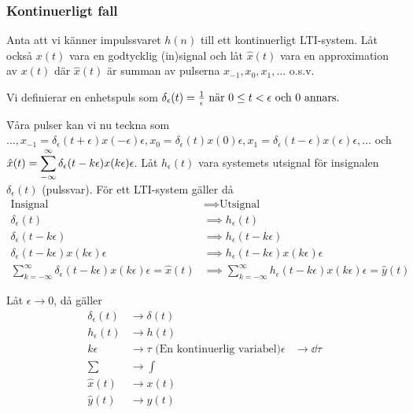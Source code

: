 \documentclass[a4paper]{article}
\begin{document}
\subsubsection{Kontinuerligt fall}
Anta att vi känner impulssvaret \(
    h(n)
\) till ett kontinuerligt LTI-system. Låt också \(
    x(t)
\) vara en godtycklig (in)signal och låt \(
    \hat{x}(t) 
\) vara en approximation av \(
    x(t)
\) där \(
    \hat{x}(t)
\) är summan av pulserna \(
    x_{-1}, x_0, x_1, \dots
\) o.s.v.

Vi definierar en enhetspuls som \(
    \delta_\epsilon(t) = \frac{1}{\epsilon} \text{ när } 0 \leq t < \epsilon \text{ och } 0 \text{ annars.} 
\) 

\f

Våra pulser kan vi nu teckna som \(
    \dots, x_{-1} = \delta_\epsilon(t+\epsilon)x(-\epsilon)\epsilon, 
    x_0 = \delta_\epsilon(t)x(0)\epsilon,
    x_1 = \delta_\epsilon(t-\epsilon)x(\epsilon)\epsilon, \dots
\) och \(
    \hat{x}(t) = \displaystyle\sum_{-\infty}^{\infty} \delta_\epsilon(t-k\epsilon)x(k\epsilon)\epsilon
\). Låt \(
    h_\epsilon(t) 
\) vara systemets utsignal för insignalen \(
    \delta_\epsilon(t)
\) (pulssvar). För ett LTI-system gäller då \begin{align*}
    \text{Insignal} &\implies \text{Utsignal} \\
    \delta_\epsilon(t) &\implies h_\epsilon(t) \\
    \delta_\epsilon(t-k\epsilon) &\implies h_\epsilon(t-k\epsilon) \\
    \delta_\epsilon(t-k\epsilon)x(k\epsilon)\epsilon &\implies h_\epsilon(t-k\epsilon)x(k\epsilon)\epsilon \\
    \sum_{k = -\infty}^{\infty} \delta_\epsilon(t-k\epsilon)x(k\epsilon)\epsilon = \hat{x}(t) &\implies \sum_{k = -\infty}^{\infty} h_\epsilon(t-k\epsilon)x(k\epsilon)\epsilon = \hat{y}(t)
\end{align*}

Låt \(
    \epsilon \to 0
\), då gäller \begin{align*}
    \delta_\epsilon(t) &\to \delta(t) \\
    h_\epsilon(t) &\to h(t) \\
    k\epsilon &\to \tau \text{ (En kontinuerlig variabel)} 
    \epsilon &\to \dd \tau \\
    \sum &\to \int \\
    \hat{x}(t) &\to x(t) \\
    \hat{y}(t) &\to y(t) 
\end{align*}
\end{document}
